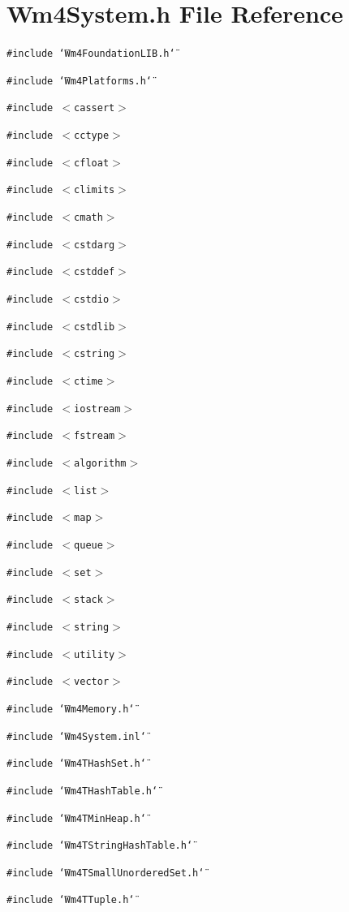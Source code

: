 \section{Wm4System.h File Reference}
\label{Wm4System_8h}
{\tt \#include \char`\"{}Wm4Foundation\-LIB.h\char`\"{}}\par
{\tt \#include \char`\"{}Wm4Platforms.h\char`\"{}}\par
{\tt \#include $<$cassert$>$}\par
{\tt \#include $<$cctype$>$}\par
{\tt \#include $<$cfloat$>$}\par
{\tt \#include $<$climits$>$}\par
{\tt \#include $<$cmath$>$}\par
{\tt \#include $<$cstdarg$>$}\par
{\tt \#include $<$cstddef$>$}\par
{\tt \#include $<$cstdio$>$}\par
{\tt \#include $<$cstdlib$>$}\par
{\tt \#include $<$cstring$>$}\par
{\tt \#include $<$ctime$>$}\par
{\tt \#include $<$iostream$>$}\par
{\tt \#include $<$fstream$>$}\par
{\tt \#include $<$algorithm$>$}\par
{\tt \#include $<$list$>$}\par
{\tt \#include $<$map$>$}\par
{\tt \#include $<$queue$>$}\par
{\tt \#include $<$set$>$}\par
{\tt \#include $<$stack$>$}\par
{\tt \#include $<$string$>$}\par
{\tt \#include $<$utility$>$}\par
{\tt \#include $<$vector$>$}\par
{\tt \#include \char`\"{}Wm4Memory.h\char`\"{}}\par
{\tt \#include \char`\"{}Wm4System.inl\char`\"{}}\par
{\tt \#include \char`\"{}Wm4THash\-Set.h\char`\"{}}\par
{\tt \#include \char`\"{}Wm4THash\-Table.h\char`\"{}}\par
{\tt \#include \char`\"{}Wm4TMin\-Heap.h\char`\"{}}\par
{\tt \#include \char`\"{}Wm4TString\-Hash\-Table.h\char`\"{}}\par
{\tt \#include \char`\"{}Wm4TSmall\-Unordered\-Set.h\char`\"{}}\par
{\tt \#include \char`\"{}Wm4TTuple.h\char`\"{}}\par


